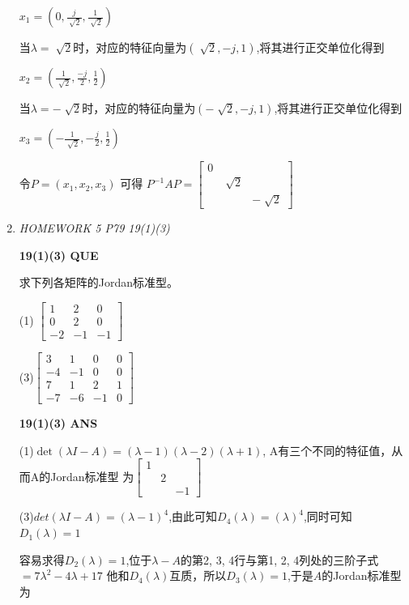 \documentclass[11pt,letterpaper]{ctexart}
\begin{document}
\begin{enumerate}
$x_1 = (0, \frac{j}{\sqrt[]{2}}, \frac{1}{\sqrt[]{2}})$

当$\lambda = \sqrt[]{2}$时，对应的特征向量为$(\sqrt[]{2}, -j, 1)$,将其进行正交单位化得到

$x_2 = (\frac{1}{\sqrt[]{2}}, \frac{-j}{2}, \frac{1}{2})$

当$\lambda = - \sqrt[]{2}$时，对应的特征向量为$(-\sqrt[]{2}, -j, 1)$,将其进行正交单位化得到

$x_3 = (-\frac{1}{\sqrt[]{2}}, -\frac{j}{2}, \frac{1}{2})$


令$P = (x_1, x_2, x_3)$ 可得 $P^{-1}AP = \begin{bmatrix}
	0 & & \\
	& \sqrt[]{2} & \\
	& & -\sqrt[]{2} 
\end{bmatrix}$


\item \textit{HOMEWORK 5 {P79 19(1)(3)}}%


\textbf{19(1)(3) QUE}
\bigskip

求下列各矩阵的Jordan标准型。

(1) $\begin{bmatrix}
	1 & 2 & 0 \\
0 & 2 & 0 \\
-2 & -1 & -1  
\end{bmatrix}$

(3)$\begin{bmatrix}
	3 & 1 & 0 & 0 \\
-4 & -1 & 0 & 0\\
7 & 1 & 2 & 1 \\
-7 & -6 & -1 & 0  
\end{bmatrix}$

\textbf{19(1)(3) ANS}
\bigskip


(1)$\det(\lambda I - A) = (\lambda - 1)(\lambda - 2)(\lambda + 1)$, A有三个不同的特征值，从而A的Jordan标准型
为$\begin{bmatrix}
	1 &  &  \\
 & 2 &  \\
 &  & -1  
\end{bmatrix}$

(3)$det(\lambda I - A) = (\lambda - 1)^4$,由此可知$D_4(\lambda) = (\lambda)^4$,同时可知 $D_1(\lambda) = 1$

容易求得$D_2(\lambda) = 1$,位于$\lambda - A$的第2, 3, 4行与第1, 2, 4列处的三阶子式 $ = 7 \lambda^2 - 4 \lambda + 17$
他和$D_4(\lambda)$互质，所以$D_3(\lambda) = 1$,于是$A$的Jordan标准型为


\end{enumerate}
\end{document}
